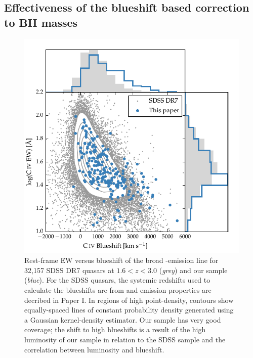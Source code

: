 \subsection{Effectiveness of the  blueshift based correction to BH masses}
\label{sec:effectiveness}

\begin{figure}
    \includegraphics[width=\columnwidth]{figures/chapter03/civ_space.pdf} 
    \caption{Rest-frame EW versus blueshift of the broad -emission line for 32,157 SDSS DR7 quasars at $1.6 < z < 3.0$ ({\it grey}) and our sample ({\it blue}). For the SDSS quasars, the systemic redshifts used to calculate the blueshifts are from \citet{hewett10} and  emission properties are decribed in Paper I. In regions of high point-density, contours show equally-spaced lines of constant probability density generated using a Gaussian kernel-density estimator. Our sample has very good coverage; the shift to high blueshifts is a result of the high luminosity of our sample in relation to the SDSS sample and the correlation between luminosity and blueshift.} 
    \label{fig:civ_space}
\end{figure}

